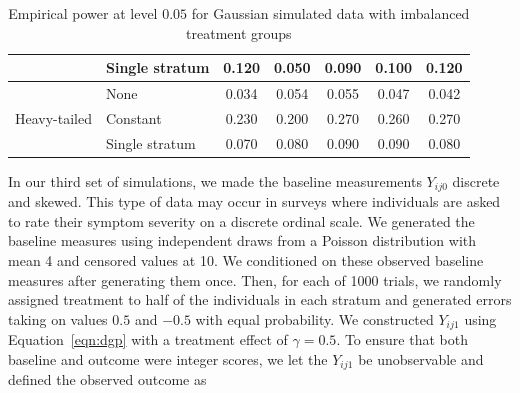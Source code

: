 \documentclass[12pt]{article}
\begin{document}
\begin{table}[ht]
\begin{tabular}{ll|ccccc}
                              & Single stratum                                              & 0.120                      & 0.050                                                                                & 0.090                                                                                 & 0.100                                                                        & 0.120                                                                        \\ \hline
\multirow{3}{*}{Heavy-tailed} & None                                                        & 0.034                      & 0.054                                                                                & 0.055                                                                                 & 0.047                                                                        & 0.042                                                                        \\
                              & Constant                                                    & 0.230                      & 0.200                                                                                & 0.270                                                                                 & 0.260                                                                        & 0.270                                                                        \\
                              & Single stratum                                              & 0.070                      & 0.080                                                                                & 0.090                                                                                 & 0.090                                                                        & 0.080                                                                        \\ \hline
\end{tabular}
\caption{Empirical power at level $0.05$ for Gaussian simulated data with imbalanced treatment groups} 
\end{table}

In our third set of simulations, we made the baseline measurements $Y_{ij0}$ discrete and skewed.
This type of data may occur in surveys where individuals are asked to rate their symptom severity on a discrete ordinal scale.
We generated the baseline measures using independent draws from a Poisson distribution with mean 4 and censored values at 10.
We conditioned on these observed baseline measures after generating them once.
Then, for each of 1000 trials, we randomly assigned treatment to half of the individuals in each stratum and generated errors taking on values $0.5$ and $-0.5$ with equal probability.
We constructed $Y_{ij1}$ using Equation~\ref{eqn:dgp} with a treatment effect of $\gamma = 0.5$.
To ensure that both baseline and outcome were integer scores, we let the $Y_{ij1}$ be unobservable and defined the observed outcome as
\end{document}
